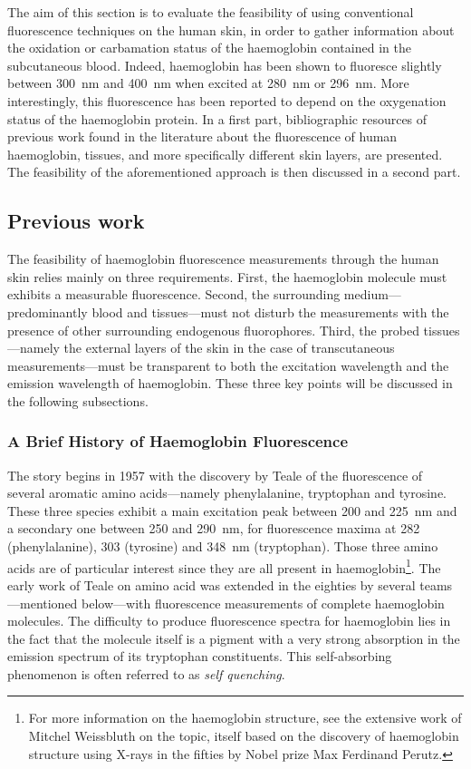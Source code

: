 The aim of this section is to evaluate the feasibility of using conventional fluorescence techniques on the human skin, in order to gather information about the oxidation or carbamation status of the haemoglobin contained in the subcutaneous blood. Indeed, haemoglobin has been shown to fluoresce slightly between 300~nm and 400~nm when excited at 280~nm or 296~nm. More interestingly, this fluorescence has been reported to depend on the oxygenation status of the haemoglobin protein\cite{itoh1981, hirsch2003}. In a first part, bibliographic resources of previous work found in the literature about the fluorescence of human haemoglobin, tissues, and more specifically different skin layers, are presented. The feasibility of the aforementioned approach is then discussed in a second part.

\subsection{Previous work}\label{sect:co2hb:fluo:prev_work}

The feasibility of haemoglobin fluorescence measurements through the human skin relies mainly on three requirements. First, the haemoglobin molecule must exhibits a measurable fluorescence. Second, the surrounding medium---predominantly blood and tissues---must not disturb the measurements with the presence of other surrounding endogenous fluorophores. Third, the probed tissues---namely the external layers of the skin in the case of transcutaneous measurements---must be transparent to both the excitation wavelength and the emission wavelength of haemoglobin. These three key points will be discussed in the following subsections.

\subsubsection{A Brief History of Haemoglobin Fluorescence}\label{sect:co2hb:fluo:hb_fluo}

The story begins in 1957 with the discovery by Teale \etal{} of the fluorescence of several aromatic amino acids---namely phenylalanine, tryptophan and tyrosine\cite{teale1957}. These three species exhibit a main excitation peak between 200 and 225~nm and a secondary one between 250 and 290~nm, for fluorescence maxima at 282 (phenylalanine), 303 (tyrosine) and 348~nm (tryptophan). Those three amino acids are of particular interest since they are all present in haemoglobin\footnote{For more information on the haemoglobin structure, see the extensive work of Mitchel Weissbluth on the topic\cite[Table~1.1]{weissbluth1974}, itself based on the discovery of haemoglobin structure using X-rays in the fifties by Nobel prize Max Ferdinand Perutz\cite{perutz1964}.}. The early work of Teale on amino acid was extended in the eighties by several teams---mentioned below---with fluorescence measurements of complete haemoglobin molecules. The difficulty to produce fluorescence spectra for haemoglobin lies in the fact that the molecule itself is a pigment with a very strong absorption in the emission spectrum of its tryptophan constituents. This self-absorbing phenomenon is often referred to as \emph{self quenching}.

